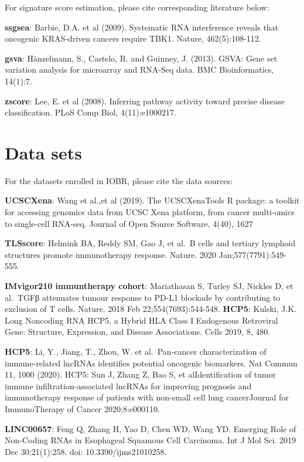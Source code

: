 \documentclass[
  12pt,
]{book}
\begin{document}
For signature score estimation, please cite corresponding literature below:

\textbf{ssgsea}: Barbie, D.A. et al (2009). Systematic RNA interference reveals that oncogenic KRAS-driven cancers require TBK1. Nature, 462(5):108-112.

\textbf{gsva}: Hänzelmann, S., Castelo, R. and Guinney, J. (2013). GSVA: Gene set variation analysis for microarray and RNA-Seq data. BMC Bioinformatics, 14(1):7.

\textbf{zscore}: Lee, E. et al (2008). Inferring pathway activity toward precise disease classification. PLoS Comp Biol, 4(11):e1000217.

\hypertarget{data-sets}{%
\section{Data sets}\label{data-sets}}

For the datasets enrolled in IOBR, please cite the data sources:

\textbf{UCSCXena}: Wang et al.,et al (2019). The UCSCXenaTools R package: a toolkit for accessing genomics data from UCSC Xena platform, from cancer multi-omics to single-cell RNA-seq. Journal of Open Source Software, 4(40), 1627

\textbf{TLSscore}: Helmink BA, Reddy SM, Gao J, et al.~B cells and tertiary lymphoid structures promote immunotherapy response. Nature. 2020 Jan;577(7791):549-555.

\textbf{IMvigor210 immuntherapy cohort}: Mariathasan S, Turley SJ, Nickles D, et al.~TGFβ attenuates tumour response to PD-L1 blockade by contributing to exclusion of T cells. Nature. 2018 Feb 22;554(7693):544-548.
\textbf{HCP5}: Kulski, J.K. Long Noncoding RNA HCP5, a Hybrid HLA Class I Endogenous Retroviral Gene: Structure, Expression, and Disease Associations. Cells 2019, 8, 480.

\textbf{HCP5}: Li, Y., Jiang, T., Zhou, W. et al.~Pan-cancer characterization of immune-related lncRNAs identifies potential oncogenic biomarkers. Nat Commun 11, 1000 (2020).
HCP5: Sun J, Zhang Z, Bao S, et alIdentification of tumor immune infiltration-associated lncRNAs for improving prognosis and immunotherapy response of patients with non-small cell lung cancerJournal for ImmunoTherapy of Cancer 2020;8:e000110.

\textbf{LINC00657}: Feng Q, Zhang H, Yao D, Chen WD, Wang YD. Emerging Role of Non-Coding RNAs in Esophageal Squamous Cell Carcinoma. Int J Mol Sci. 2019 Dec 30;21(1):258. doi: 10.3390/ijms21010258.
\end{document}
